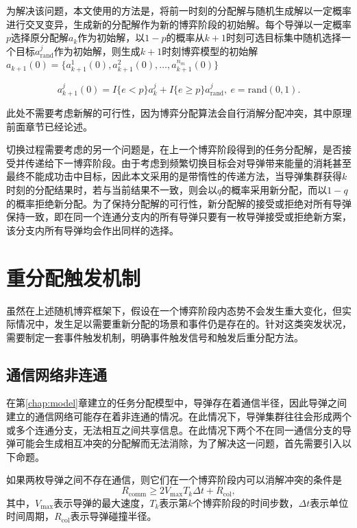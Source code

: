 为解决该问题，本文使用的方法是，将前一时刻的分配解与随机生成解以一定概率进行交叉变异，生成新的分配解作为新的博弈阶段的初始解。每个导弹以一定概率$p$选择原分配解$a_k$作为初始解，以$1-p$的概率从$k+1$时刻可选目标集中随机选择一个目标$a_{\text{rand}}^j$作为初始解，则生成$k+1$时刻博弈模型的初始解$a_{k+1}(0)=\{a_{k+1}^1(0),a_{k+1}^2(0),\dots,a_{k+1}^{n_m}(0)\}$

\begin{equation}
\label{sg:eq:crossfactor}
	a_{k+1}^j(0) = I\{e<p\}a_k^j + I\{e \geq p\}a_{\text{rand}}^j,\ e = \mathrm{rand}(0,1).
\end{equation}

此处不需要考虑新解的可行性，因为博弈分配算法会自行消解分配冲突，其中原理前面章节已经论述。

切换过程需要考虑的另一个问题是，在上一个博弈阶段得到的任务分配解，是否接受并传递给下一博弈阶段。由于考虑到频繁切换目标会对导弹带来能量的消耗甚至最终不能成功击中目标，因此本文采用的是带惰性的传递方法，当导弹集群获得$k$时刻的分配结果时，若与当前结果不一致，则会以$q$的概率采用新分配，而以$1-q$的概率拒绝新分配。为了保持分配解的可行性，新分配解的接受或拒绝对所有导弹保持一致，即在同一个连通分支内的所有导弹只要有一枚导弹接受或拒绝新方案，该分支内所有导弹均会作出同样的选择。




\section{重分配触发机制}
\label{sg:special_incidence}

虽然在上述随机博弈框架下，假设在一个博弈阶段内态势不会发生重大变化，但实际情况中，发生足以需要重新分配的场景和事件仍是存在的。针对这类突发状况，需要制定一套事件触发机制，明确事件触发信号和触发后重分配方法。

\subsection{通信网络非连通}
\label{special:disconnected_network}

在第\ref{chap:model}章建立的任务分配模型中，导弹存在着通信半径，因此导弹之间建立的通信网络可能存在着非连通的情况。在此情况下，导弹集群往往会形成两个或多个连通分支，无法相互之间共享信息。在此情况下两个不在同一通信分支的导弹可能会生成相互冲突的分配解而无法消除，为了解决这一问题，首先需要引入以下命题。

\begin{proposition}[可消解冲突]
	如果两枚导弹之间不存在通信，则它们在一个博弈阶段内可以消解冲突的条件是
	\begin{equation}
	\label{sg:eq:collision}
		R_{\text{comm}} \geq 2 V_{\text{max}} T_k \Delta t + R_{\text{col}},
	\end{equation}
	其中，$V_{\text{max}}$表示导弹的最大速度，$T_k$表示第$k$个博弈阶段的时间步数，$\Delta t$表示单位时间周期，$R_{\text{col}}$表示导弹碰撞半径。
\end{proposition}

